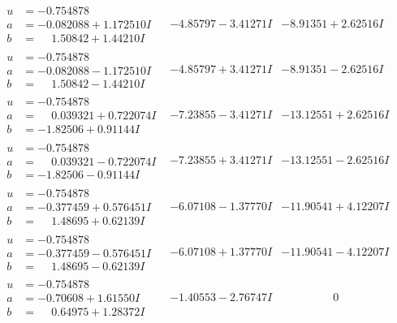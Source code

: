 \documentclass[1p]{elsarticle_modified}
\theoremstyle{definition}
\begin{document}
$$\begin{array}{c|c|c}
\begin{aligned}
u &= -0.754878\phantom{ +0.000000I} \\
a &= -0.082088 + 1.172510 I \\
b &= \phantom{-}1.50842 + 1.44210 I\end{aligned}
 & -4.85797 - 3.41271 I & -8.91351 + 2.62516 I \\ \hline\begin{aligned}
u &= -0.754878\phantom{ +0.000000I} \\
a &= -0.082088 - 1.172510 I \\
b &= \phantom{-}1.50842 - 1.44210 I\end{aligned}
 & -4.85797 + 3.41271 I & -8.91351 - 2.62516 I \\ \hline\begin{aligned}
u &= -0.754878\phantom{ +0.000000I} \\
a &= \phantom{-}0.039321 + 0.722074 I \\
b &= -1.82506 + 0.91144 I\end{aligned}
 & -7.23855 - 3.41271 I & -13.12551 + 2.62516 I \\ \hline\begin{aligned}
u &= -0.754878\phantom{ +0.000000I} \\
a &= \phantom{-}0.039321 - 0.722074 I \\
b &= -1.82506 - 0.91144 I\end{aligned}
 & -7.23855 + 3.41271 I & -13.12551 - 2.62516 I \\ \hline\begin{aligned}
u &= -0.754878\phantom{ +0.000000I} \\
a &= -0.377459 + 0.576451 I \\
b &= \phantom{-}1.48695 + 0.62139 I\end{aligned}
 & -6.07108 - 1.37770 I & -11.90541 + 4.12207 I \\ \hline\begin{aligned}
u &= -0.754878\phantom{ +0.000000I} \\
a &= -0.377459 - 0.576451 I \\
b &= \phantom{-}1.48695 - 0.62139 I\end{aligned}
 & -6.07108 + 1.37770 I & -11.90541 - 4.12207 I \\ \hline\begin{aligned}
u &= -0.754878\phantom{ +0.000000I} \\
a &= -0.70608 + 1.61550 I \\
b &= \phantom{-}0.64975 + 1.28372 I\end{aligned}
 & -1.40553 - 2.76747 I & \phantom{-0.000000 } 0 \\ \hline\begin{aligned}

\end{aligned}
\end{array}$$
\end{document}
